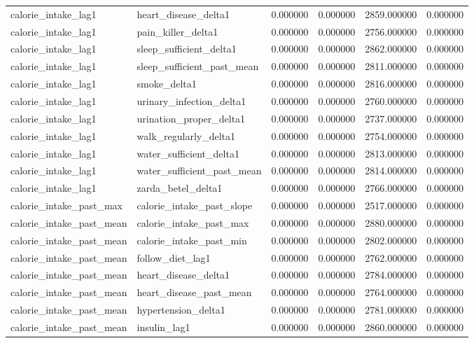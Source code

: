 \begin{longtable}{llrrrr}
calorie\_intake\_lag1 & heart\_disease\_delta1 & 0.000000 & 0.000000 & 2859.000000 & 0.000000 \\
calorie\_intake\_lag1 & pain\_killer\_delta1 & 0.000000 & 0.000000 & 2756.000000 & 0.000000 \\
calorie\_intake\_lag1 & sleep\_sufficient\_delta1 & 0.000000 & 0.000000 & 2862.000000 & 0.000000 \\
calorie\_intake\_lag1 & sleep\_sufficient\_past\_mean & 0.000000 & 0.000000 & 2811.000000 & 0.000000 \\
calorie\_intake\_lag1 & smoke\_delta1 & 0.000000 & 0.000000 & 2816.000000 & 0.000000 \\
calorie\_intake\_lag1 & urinary\_infection\_delta1 & 0.000000 & 0.000000 & 2760.000000 & 0.000000 \\
calorie\_intake\_lag1 & urination\_proper\_delta1 & 0.000000 & 0.000000 & 2737.000000 & 0.000000 \\
calorie\_intake\_lag1 & walk\_regularly\_delta1 & 0.000000 & 0.000000 & 2754.000000 & 0.000000 \\
calorie\_intake\_lag1 & water\_sufficient\_delta1 & 0.000000 & 0.000000 & 2813.000000 & 0.000000 \\
calorie\_intake\_lag1 & water\_sufficient\_past\_mean & 0.000000 & 0.000000 & 2814.000000 & 0.000000 \\
calorie\_intake\_lag1 & zarda\_betel\_delta1 & 0.000000 & 0.000000 & 2766.000000 & 0.000000 \\
calorie\_intake\_past\_max & calorie\_intake\_past\_slope & 0.000000 & 0.000000 & 2517.000000 & 0.000000 \\
calorie\_intake\_past\_mean & calorie\_intake\_past\_max & 0.000000 & 0.000000 & 2880.000000 & 0.000000 \\
calorie\_intake\_past\_mean & calorie\_intake\_past\_min & 0.000000 & 0.000000 & 2802.000000 & 0.000000 \\
calorie\_intake\_past\_mean & follow\_diet\_lag1 & 0.000000 & 0.000000 & 2762.000000 & 0.000000 \\
calorie\_intake\_past\_mean & heart\_disease\_delta1 & 0.000000 & 0.000000 & 2784.000000 & 0.000000 \\
calorie\_intake\_past\_mean & heart\_disease\_past\_mean & 0.000000 & 0.000000 & 2764.000000 & 0.000000 \\
calorie\_intake\_past\_mean & hypertension\_delta1 & 0.000000 & 0.000000 & 2781.000000 & 0.000000 \\
calorie\_intake\_past\_mean & insulin\_lag1 & 0.000000 & 0.000000 & 2860.000000 & 0.000000 \\

\end{longtable}
